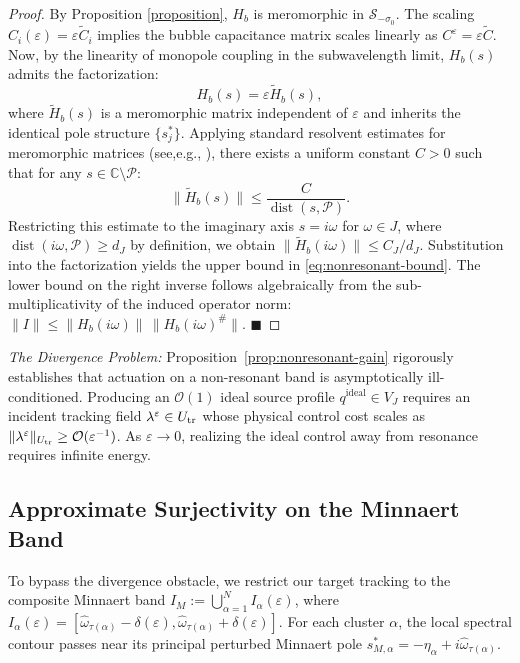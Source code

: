 \documentclass[11pt,a4paper]{article}
\numberwithin{equation}{section}
\begin{document}
\begin{proof}
By Proposition \ref{proposition}, $H_b$ is meromorphic in $\mathcal{S}_{-\sigma_0}$. The scaling $C_i(\varepsilon) = \varepsilon \tilde{C}_i$ implies the bubble capacitance matrix scales linearly as $C^\varepsilon = \varepsilon \tilde{C}$. Now, by the linearity of monopole coupling in the subwavelength limit, $H_b(s)$ admits the factorization: 
$$H_b(s) = \varepsilon \tilde{H}_b(s),$$ 
where $\tilde{H}_b(s)$ is a meromorphic matrix independent of $\varepsilon$ and inherits the identical pole structure $\{s_j^\ast\}$.
\newline
Applying standard resolvent estimates for meromorphic matrices (see,e.g., \cite{TucsnakWeissBook}), there exists a uniform constant $C > 0$ such that for any $s \in \mathbb{C} \setminus \mathcal{P}$:
\[
\|\tilde{H}_b(s)\| \le \frac{C}{\operatorname{dist}(s, \mathcal{P})}.
\]
Restricting this estimate to the imaginary axis $s=i\omega$ for $\omega \in J$, where $\operatorname{dist}(i\omega, \mathcal{P}) \ge d_J$ by definition, we obtain $\|\tilde{H}_b(i\omega)\| \le C_J / d_J$. Substitution into the factorization yields the upper bound in \eqref{eq:nonresonant-bound}.
\newline
The lower bound on the right inverse follows algebraically from the sub-multiplicativity of the induced operator norm: $\|I\| \le \|H_b(i\omega)\|\,\|H_b(i\omega)^{\#}\|$. \hfill $\blacksquare$
\end{proof}

\noindent
\textit{The Divergence Problem:} Proposition~\ref{prop:nonresonant-gain} rigorously establishes that actuation on a non-resonant band is asymptotically ill-conditioned. Producing an $\mathcal{O}(1)$ ideal source profile $q^{\mathrm{ideal}} \in V_J$ requires an incident tracking field $\lambda^\varepsilon \in U_{\rm tr}$ whose physical control cost scales as $\|\lambda^\varepsilon\|_{U_{\rm tr}} \ge \mathcal{O}(\varepsilon^{-1})$. As $\varepsilon \to 0$, realizing the ideal control away from resonance requires infinite energy.


\subsection{Approximate Surjectivity on the Minnaert Band}\label{sec:Minnaert}\label{appsur}
\noindent
To bypass the divergence obstacle, we restrict our target tracking to the composite Minnaert band $I_M := \bigcup_{\alpha=1}^N I_\alpha(\varepsilon)$, where $I_\alpha(\varepsilon) = [\hat{\omega}_{\tau(\alpha)} - \delta(\varepsilon), \hat{\omega}_{\tau(\alpha)} + \delta(\varepsilon)]$. For each cluster $\alpha$, the local spectral contour passes near its principal perturbed Minnaert pole $s^\ast_{M,\alpha} = -\eta_\alpha + i\hat{\omega}_{\tau(\alpha)}$.
\end{document}
